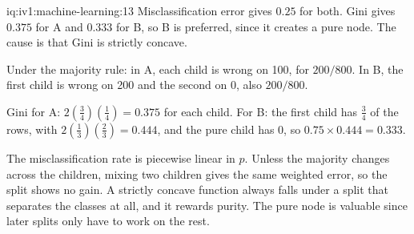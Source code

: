 \begin{solution}{iq:iv1:machine-learning:13}
Misclassification error gives $0.25$ for both. Gini gives $0.375$ for A and $0.333$ for B, so B is preferred, since it creates a pure node. The cause is that Gini is strictly concave.

Under the majority rule: in A, each child is wrong on 100, for $200/800$. In B, the first child is wrong on 200 and the second on 0, also $200/800$.

Gini for A: $2(\frac34)(\frac14) = 0.375$ for each child. For B: the first child has $\frac34$ of the rows, with $2(\frac13)(\frac23) = 0.444$, and the pure child has 0, so $0.75 \times 0.444 = 0.333$.

The misclassification rate is piecewise linear in $p$. Unless the majority changes across the children, mixing two children gives the same weighted error, so the split shows no gain. A strictly concave function always falls under a split that separates the classes at all, and it rewards purity. The pure node is valuable since later splits only have to work on the rest.



\end{solution}

